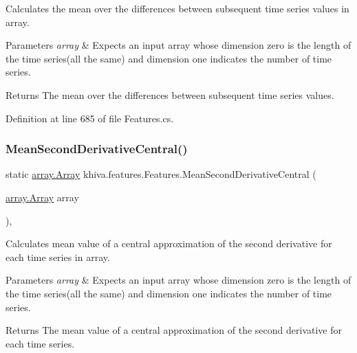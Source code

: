 Calculates the mean over the differences between subsequent time series values in array. 


\begin{DoxyParams}{Parameters}
{\em array} & Expects an input array whose dimension zero is the length of the time series(all the same) and dimension one indicates the number of time series.\\
\hline
\end{DoxyParams}
\begin{DoxyReturn}{Returns}
The mean over the differences between subsequent time series values.
\end{DoxyReturn}


Definition at line 685 of file Features.\+cs.

\mbox{\label{classkhiva_1_1features_1_1_features_a9110d16052e9f3272eccc127cc0b9e36}} 
\subsubsection{\texorpdfstring{Mean\+Second\+Derivative\+Central()}{MeanSecondDerivativeCentral()}}
{\footnotesize\ttfamily static \mbox{\hyperlink{classkhiva_1_1array_1_1_array}{array.\+Array}} khiva.\+features.\+Features.\+Mean\+Second\+Derivative\+Central (\begin{DoxyParamCaption}\item[{\mbox{\hyperlink{classkhiva_1_1array_1_1_array}{array.\+Array}}}]{array }\end{DoxyParamCaption})\hspace{0.3cm}{\ttfamily [inline]}, {\ttfamily [static]}}



Calculates mean value of a central approximation of the second derivative for each time series in array. 


\begin{DoxyParams}{Parameters}
{\em array} & Expects an input array whose dimension zero is the length of the time series(all the same) and dimension one indicates the number of time series.\\
\hline
\end{DoxyParams}
\begin{DoxyReturn}{Returns}
The mean value of a central approximation of the second derivative for each time series.
\end{DoxyReturn}


